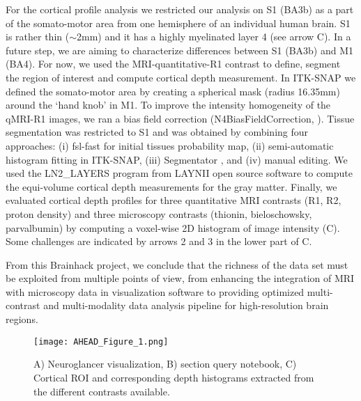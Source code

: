 \documentclass[../main.tex]{subfiles}
\begin{document}
For the cortical profile analysis we restricted our analysis on S1 (BA3b) as a part of the somato-motor area from one hemisphere of an individual human brain. S1 is rather thin (\(\sim\)2mm) and it has a highly myelinated layer 4 (see arrow C). In a future step, we are aiming to characterize differences between S1 (BA3b) and M1 (BA4). For now, we used the MRI-quantitative-R1 contrast to define, segment the region of interest and compute cortical depth measurement. In ITK-SNAP \parencite{Yushkevich2006} we defined the somato-motor area by creating a spherical mask (radius 16.35mm) around the ‘hand knob’ in M1. To improve the intensity homogeneity of the qMRI-R1 images, we ran a bias field correction (N4BiasFieldCorrection, \parencite{Cox1996}). Tissue segmentation was restricted to S1 and was obtained by combining four approaches: (i) fsl-fast \parencite{Smith2004} for initial tissues probability map, (ii) semi-automatic histogram fitting in ITK-SNAP, (iii) Segmentator \parencite{Gulban2018}, and (iv) manual editing. We used the LN2\_LAYERS program from LAYNII open source software \parencite{Huber2021}  to compute the equi-volume cortical depth measurements for the gray matter. Finally, we evaluated cortical depth profiles for three quantitative MRI contrasts (R1, R2, proton density) and three microscopy contrasts (thionin, bieloschowsky, parvalbumin) by computing a voxel-wise 2D histogram of image intensity (C). Some challenges are indicated by arrows 2 and 3 in the lower part of C.

From this Brainhack project, we conclude that the richness of the data set must be exploited from multiple points of view, from enhancing the integration of MRI with microscopy data in visualization software to providing optimized multi-contrast and multi-modality data analysis pipeline for high-resolution brain regions.



\begin{figure*}
	\centering
	\texttt{[image: AHEAD\_Figure\_1.png]}
	\caption{A) Neuroglancer visualization, B) section query notebook, C) Cortical ROI and corresponding depth histograms extracted from the different contrasts available.
	}
	\label{fig:ahead}
\end{figure*}
\end{document}
